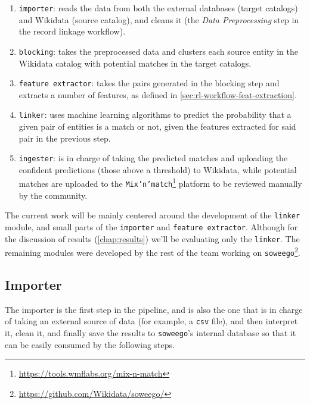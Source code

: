 \documentclass[epsfig,a4paper,11pt,titlepage,twoside,openany]{book}
\newcommand{\footurl}[1]{\footnote{\url{#1}}}
\begin{document}
\begin{enumerate}
\item \texttt{importer}: 
reads the data from both the external databases (target catalogs) and Wikidata (source catalog), and cleans it (the \textit{Data Preprocessing} step in the record linkage workflow).
 
\item \texttt{blocking}: 
takes the preprocessed data and clusters each source entity in the Wikidata catalog with potential matches in the target catalogs.
  
\item \texttt{feature extractor}: 
takes the pairs generated in the blocking step and extracts a number of features, as defined in \autoref{sec:rl-workflow-feat-extraction}.
 
\item \texttt{linker}: 
uses machine learning algorithms to predict the probability that a given pair of entities is a match or not, given the features extracted for said pair in the previous step.
 
\item \texttt{ingester}: 
is in charge of taking the predicted matches and uploading the confident predictions (those above a threshold) to Wikidata, while potential matches are uploaded to the \texttt{Mix'n'match}\footurl{https://tools.wmflabs.org/mix-n-match} platform to be reviewed manually by the community.
\end{enumerate}

The current work will be mainly centered around the development of the \texttt{linker} module, and small parts of the \texttt{importer} and \texttt{feature extractor}. Although for the discussion of results  (\autoref{chap:results}) we'll be evaluating only the \texttt{linker}.  The remaining modules were developed by the rest of the team working on \texttt{soweego}\footurl{https://github.com/Wikidata/soweego/}.


\subsection{Importer}
\label{sec:soweego-st-importer}

The importer is the first step in the pipeline, and is also the one that is in charge of taking an external source of data (for example, a \texttt{csv} file), and then interpret it, clean it, and finally save the results to \texttt{soweego}'s internal database so that it can be easily consumed by the following steps.
\end{document}
